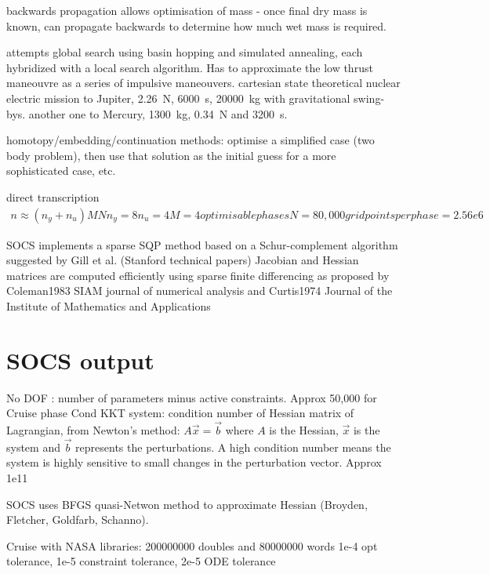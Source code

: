 backwards propagation allows optimisation of mass - once final dry mass is known, can propagate backwards to determine how much wet mass is required.


\cite{Yam2011} attempts global search using basin hopping and simulated annealing, each hybridized with a local search algorithm. Has to approximate the low thrust maneouvre as a series of impulsive maneouvers.
cartesian state
theoretical nuclear electric mission to Jupiter, 2.26~N, 6000~s, 20000~kg with gravitational swing-bys.
another one to Mercury, 1300~kg, 0.34~N and 3200~s.


homotopy/embedding/continuation methods: optimise a simplified case (two body problem), then use that solution as the initial guess for a more sophisticated case, etc.


direct transcription
\begin{gather}
n \approx (n_y + n_u)MN
n_y = 8
n_u = 4
M = 4 optimisable phases
N = 80,000 grid points per phase
=2.56e6
\end{gather}
\cite{Betts1998}

SOCS implements a sparse SQP method based on a Schur-complement algorithm suggested by Gill et al. (Stanford technical papers)
Jacobian and Hessian matrices are computed efficiently using sparse finite differencing as proposed by Coleman1983 SIAM journal of numerical analysis and Curtis1974 Journal of the Institute of Mathematics and Applications

\section{SOCS output}
No DOF : number of parameters minus active constraints. Approx 50,000 for Cruise phase
Cond KKT system: condition number of Hessian matrix of Lagrangian, from Newton's method: $A\vec{x}=\vec{b}$ where $A$ is the Hessian, $\vec{x}$ is the system and $\vec{b}$ represents the perturbations. A high condition number means the system is highly sensitive to small changes in the perturbation vector. Approx 1e11

SOCS uses BFGS quasi-Netwon method to approximate Hessian (Broyden, Fletcher, Goldfarb, Schanno).

Cruise with NASA libraries: 200000000 doubles and 80000000 words
1e-4 opt tolerance, 1e-5 constraint tolerance, 2e-5 ODE tolerance